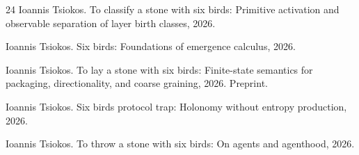 \documentclass[11pt]{article}
\theoremstyle{definition}
\newcommand{\1}{\mathbf{1}}
\begin{document}
\begin{thebibliography}{24}
Ioannis Tsiokos.
\newblock To classify a stone with six birds: Primitive activation and observable separation of layer birth classes, 2026{}.

Ioannis Tsiokos.
\newblock Six birds: Foundations of emergence calculus, 2026{}.

Ioannis Tsiokos.
\newblock To lay a stone with six birds: Finite-state semantics for packaging, directionality, and coarse graining, 2026{}.
\newblock Preprint.

Ioannis Tsiokos.
\newblock Six birds protocol trap: Holonomy without entropy production, 2026{}.

Ioannis Tsiokos.
\newblock To throw a stone with six birds: On agents and agenthood, 2026{}.

\end{thebibliography}
 
\end{document}
